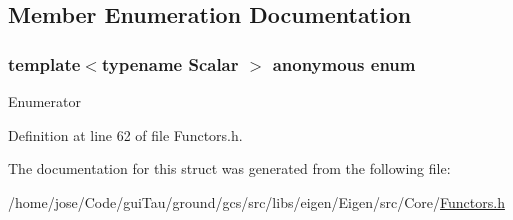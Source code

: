 \subsection{Member Enumeration Documentation}
\hypertarget{structei__functor__traits_3_01ei__scalar__product__op_3_01_scalar_01_4_01_4_a92d6f94734f47394002b8416b39b9386}{\subsubsection[{anonymous enum}]{\setlength{\rightskip}{0pt plus 5cm}template$<$typename Scalar $>$ anonymous enum}}\label{structei__functor__traits_3_01ei__scalar__product__op_3_01_scalar_01_4_01_4_a92d6f94734f47394002b8416b39b9386}
\begin{Desc}
\item[Enumerator]\par
\begin{description}
\item[{\em 
\hypertarget{structei__functor__traits_3_01ei__scalar__product__op_3_01_scalar_01_4_01_4_a92d6f94734f47394002b8416b39b9386a7f9bfce75997c8530353322711c38f92}{Cost}\label{structei__functor__traits_3_01ei__scalar__product__op_3_01_scalar_01_4_01_4_a92d6f94734f47394002b8416b39b9386a7f9bfce75997c8530353322711c38f92}
}]\end{description}
\end{Desc}


Definition at line 62 of file Functors.\-h.



The documentation for this struct was generated from the following file\-:\begin{DoxyCompactItemize}
\item 
/home/jose/\-Code/gui\-Tau/ground/gcs/src/libs/eigen/\-Eigen/src/\-Core/\hyperlink{_core_2_functors_8h}{Functors.\-h}\end{DoxyCompactItemize}
